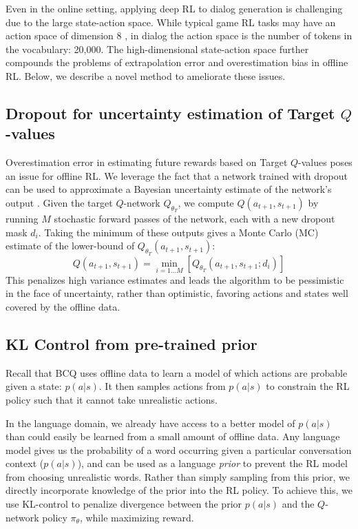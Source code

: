 Even in the online setting, applying deep RL to dialog generation is challenging due to the large state-action space. While typical game RL tasks may have an action space of dimension 8 \cite{dqn}, in dialog the action space is the number of tokens in the vocabulary: 20,000. The high-dimensional state-action space further compounds the problems of extrapolation error and overestimation bias in offline RL. Below, we describe a novel method to ameliorate these issues.

\subsection{Dropout for uncertainty estimation of Target $Q$-values}
\label{sec:dropout}
Overestimation error in estimating future rewards based on Target $Q$-values poses an issue for offline RL. We leverage the fact that a network trained with dropout can be used to approximate a Bayesian uncertainty estimate of the network's output \citep{gal2016dropout}. Given the target $Q$-network $Q_{\theta_T}$, we compute $Q(a_{t+1}, s_{t+1})$ by running $M$ stochastic forward passes of the network, each with a new dropout mask $d_i$. Taking the minimum of these outputs gives a Monte Carlo (MC) estimate of the lower-bound of $Q_{\theta_T}(a_{t+1}, s_{t+1})$: $$Q(a_{t+1}, s_{t+1}) = \min_{i=1...M}[Q_{\theta_T}(a_{t+1}, s_{t+1}; d_i)]$$ This penalizes high variance estimates and leads the algorithm to be pessimistic in the face of uncertainty, rather than optimistic, favoring actions and states well covered by the offline data. 

\subsection{KL Control from pre-trained prior}
\label{sec:klcontrol}
Recall that BCQ \cite{fujimoto2018off} uses offline data to learn a model of which actions are probable given a state: $p(a|s)$. It then samples actions from $p(a|s)$ to constrain the RL policy such that it cannot take unrealistic actions. 

In the language domain, we already have access to a better model of $p(a|s)$ than could easily be learned from a small amount of offline data. Any language model gives us the probability of a word occurring given a particular conversation context ($p(a|s)$), and can be used as a language \textit{prior} to prevent the RL model from choosing unrealistic words. Rather than simply sampling from this prior, we directly incorporate knowledge of the prior into the RL policy. To achieve this, we use KL-control to penalize divergence between the prior $p(a|s)$ and the $Q$-network policy $\pi_{\theta}$, while maximizing reward.

